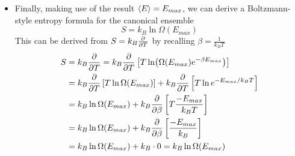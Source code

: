 \documentclass[11pt, a4paper]{article}
\begin{document}
\begin{itemize}
	\item Finally, making use of the result $ \expval{E} = E_{max} $, we can derive a Boltzmann-style entropy formula for the canonical ensemble
	\begin{equation*}
		S = k_{B}\ln \Omega(E_{max})
	\end{equation*}
	This can be derived from $ S = k_{B}\pdv{}{T} (T \ln Z) $ by recalling $ \beta = \frac{1}{k_{B}T} $
	\begin{align*}
		S &= k_{B}\pdv{}{T} (T \ln Z) = k_{B}\pdv{}{T} \left[T \ln( \Omega(E_{max})e^{-\beta E_{max}}) \right]\\
		&=k_{B}\pdv{}{T} \left[T \ln \Omega(E_{max})\right] + k_{B}\pdv{}{T}\left[T \ln e^{-E_{max}/k_{B}T}\right]\\
		&= k_{B} \ln \Omega(E_{max}) + k_{B} \pdv{}{\beta} \left[T \frac{-E_{max}}{k_{B}T}\right]\\
		&=k_{B} \ln \Omega(E_{max}) + k_{B} \pdv{}{\beta} \left[ \frac{-E_{max}}{k_{B}}\right]\\
		&=k_{B} \ln \Omega(E_{max}) + k_{B} \cdot 0 = k_{B} \ln \Omega(E_{max})
	\end{align*}
	
\end{itemize}
\end{document}

